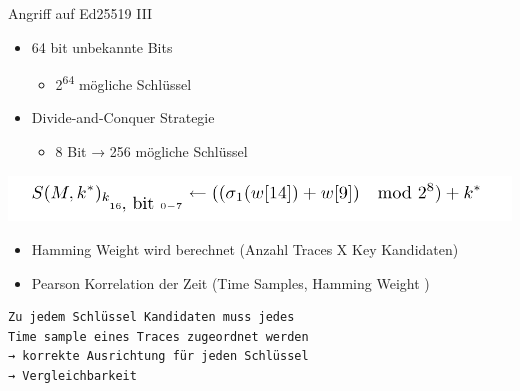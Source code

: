 \documentclass[
  10pt,
  ignorenonframetext,
  aspectratio=43,
]{beamer}
\providecommand{\tightlist}{%
  \setlength{\itemsep}{0pt}\setlength{\parskip}{0pt}}
\begin{document}
\begin{frame}[fragile]{Angriff auf Ed25519 III}
\protect\hypertarget{angriff-auf-ed25519-iii}{}
\begin{itemize}
\tightlist
\item
  64 bit unbekannte Bits

  \begin{itemize}
  \tightlist
  \item
    2\textsuperscript{64} mögliche Schlüssel
  \end{itemize}
\end{itemize}

\pause

\begin{itemize}
\tightlist
\item
  Divide-and-Conquer Strategie

  \begin{itemize}
  \tightlist
  \item
    8 Bit → 256 mögliche Schlüssel
  \end{itemize}
\end{itemize}

\pause

\includegraphics[width=\textwidth,height=0.6\textheight]{Abbildungen/keyDPA.png}

\pause

\begin{itemize}
\tightlist
\item
  Hamming Weight wird berechnet (Anzahl Traces X Key Kandidaten)
\end{itemize}

\pause

\begin{itemize}
\tightlist
\item
  Pearson Korrelation der Zeit (Time Samples, Hamming Weight )
\end{itemize}

\begin{verbatim}
Zu jedem Schlüssel Kandidaten muss jedes    
Time sample eines Traces zugeordnet werden    
→ korrekte Ausrichtung für jeden Schlüssel  
→ Vergleichbarkeit
\end{verbatim}
\end{frame}
\end{document}
